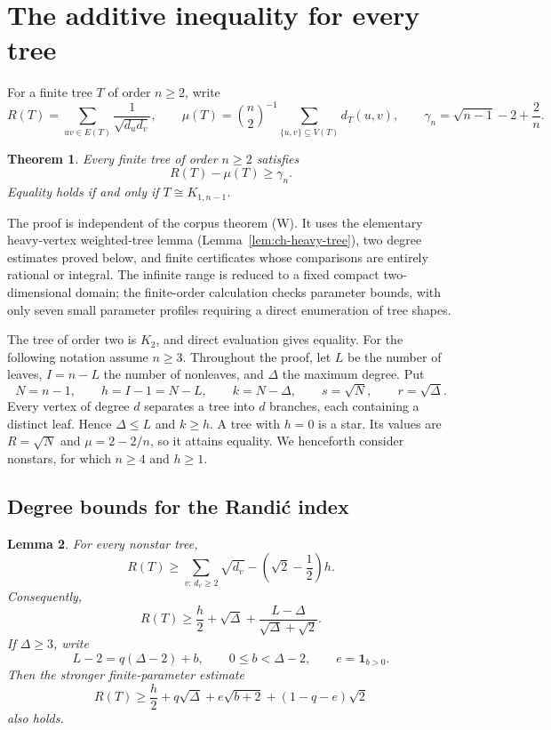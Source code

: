 \documentclass[11pt,a4paper]{article}
\newtheorem{theorem}{Theorem}[section]
\newtheorem{lemma}[theorem]{Lemma}
\theoremstyle{remark}
\numberwithin{equation}{section}
\begin{document}
\section{The additive inequality for every tree}
\label{sec:ch-all-trees}

For a finite tree $T$ of order $n\ge2$, write
\[
 R(T)=\sum_{uv\in E(T)}\frac1{\sqrt{d_ud_v}},\qquad
 \mu(T)=\binom n2^{-1}\sum_{\{u,v\}\subseteq V(T)}d_T(u,v),
 \qquad
 \gamma_n=\sqrt{n-1}-2+\frac2n.
\]

\begin{theorem}\label{thm:ch-all-trees}
Every finite tree of order $n\ge2$ satisfies
\[
                  R(T)-\mu(T)\ge\gamma_n.
\]
Equality holds if and only if $T\cong K_{1,n-1}$.
\end{theorem}

The proof is independent of the corpus theorem \textup{(W)}. It uses the
elementary heavy-vertex weighted-tree lemma
(Lemma~\ref{lem:ch-heavy-tree}), two degree estimates proved below, and
finite certificates whose comparisons are entirely rational or integral.
The infinite range is reduced to a fixed compact two-dimensional domain;
the finite-order calculation checks parameter bounds, with only seven
small parameter profiles requiring a direct enumeration of tree shapes.

The tree of order two is $K_2$, and direct evaluation gives equality.
For the following notation assume $n\ge3$. Throughout the proof, let
$L$ be the number of leaves, $I=n-L$ the number
of nonleaves, and $\Delta$ the maximum degree. Put
\[
 N=n-1,\qquad h=I-1=N-L,\qquad k=N-\Delta,
 \qquad s=\sqrt N,\qquad r=\sqrt\Delta.
\]
Every vertex of degree $d$ separates a tree into $d$ branches, each
containing a distinct leaf. Hence $\Delta\le L$ and $k\ge h$.
A tree with $h=0$ is a star. Its values are
$R=\sqrt N$ and $\mu=2-2/n$, so it attains equality.
We henceforth consider nonstars, for which $n\ge4$ and $h\ge1$.

\subsection{Degree bounds for the Randi\'c index}

\begin{lemma}\label{lem:ch-tree-degree-potential}
For every nonstar tree,
\begin{equation}\label{eq:ch-tree-degree-sum}
 R(T)\ge\sum_{v:\,d_v\ge2}\sqrt{d_v}
                  -\left(\sqrt2-\frac12\right)h.
\end{equation}
Consequently,
\begin{equation}\label{eq:ch-tree-chord}
 R(T)\ge\frac h2+\sqrt\Delta+
                    \frac{L-\Delta}{\sqrt\Delta+\sqrt2}.
\end{equation}
If $\Delta\ge3$, write
\[
 L-2=q(\Delta-2)+b,\qquad 0\le b<\Delta-2,
 \qquad e=\mathbf1_{b>0}.
\]
Then the stronger finite-parameter estimate
\begin{equation}\label{eq:ch-tree-degree-concentrated}
 R(T)\ge\frac h2+q\sqrt\Delta+e\sqrt{b+2}
                                      +(1-q-e)\sqrt2
\end{equation}
also holds.
\end{lemma}
\end{document}
